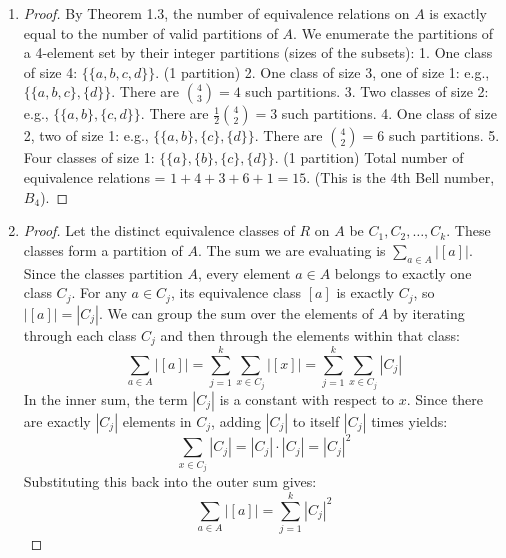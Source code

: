 \documentclass[11pt, a4paper]{article}
\theoremstyle{definition}
\theoremstyle{remark}
\begin{document}
\begin{enumerate}[label=\textbf{\arabic*.}, leftmargin=*]
\begin{proof}
    \begin{center}
    \end{center}
    \end{proof}

    \item \begin{proof}
    By Theorem 1.3, the number of equivalence relations on $A$ is exactly equal to the number of valid partitions of $A$. We enumerate the partitions of a 4-element set by their integer partitions (sizes of the subsets):
    1. One class of size 4: $\{\{a, b, c, d\}\}$. (1 partition)
    2. One class of size 3, one of size 1: e.g., $\{\{a, b, c\}, \{d\}\}$. There are $\binom{4}{3} = 4$ such partitions.
    3. Two classes of size 2: e.g., $\{\{a, b\}, \{c, d\}\}$. There are $\frac{1}{2} \binom{4}{2} = 3$ such partitions.
    4. One class of size 2, two of size 1: e.g., $\{\{a, b\}, \{c\}, \{d\}\}$. There are $\binom{4}{2} = 6$ such partitions.
    5. Four classes of size 1: $\{\{a\}, \{b\}, \{c\}, \{d\}\}$. (1 partition)
    Total number of equivalence relations = $1 + 4 + 3 + 6 + 1 = 15$. (This is the 4th Bell number, $B_4$).
    \end{proof}

    \item \begin{proof}
    Let the distinct equivalence classes of $R$ on $A$ be $C_1, C_2, \dots, C_k$. These classes form a partition of $A$.
    The sum we are evaluating is $\sum_{a \in A} |[a]|$.
    Since the classes partition $A$, every element $a \in A$ belongs to exactly one class $C_j$. For any $a \in C_j$, its equivalence class $[a]$ is exactly $C_j$, so $|[a]| = |C_j|$.
    We can group the sum over the elements of $A$ by iterating through each class $C_j$ and then through the elements within that class:
    \[ \sum_{a \in A} |[a]| = \sum_{j=1}^k \sum_{x \in C_j} |[x]| = \sum_{j=1}^k \sum_{x \in C_j} |C_j| \]
    In the inner sum, the term $|C_j|$ is a constant with respect to $x$. Since there are exactly $|C_j|$ elements in $C_j$, adding $|C_j|$ to itself $|C_j|$ times yields:
    \[ \sum_{x \in C_j} |C_j| = |C_j| \cdot |C_j| = |C_j|^2 \]
    Substituting this back into the outer sum gives:
    \[ \sum_{a \in A} |[a]| = \sum_{j=1}^k |C_j|^2 \]
    \end{proof}


\end{enumerate}
\end{document}
